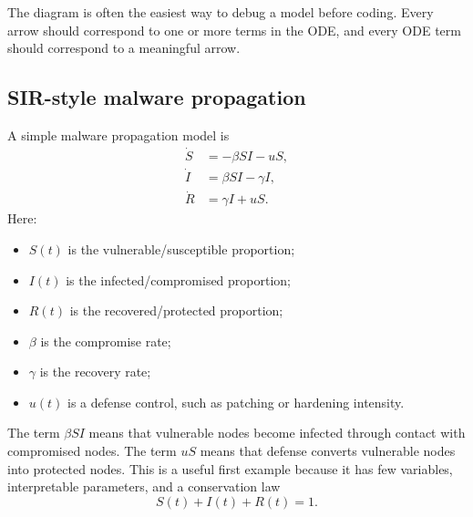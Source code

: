 \documentclass[11pt,a4paper]{article}
\begin{document}
\begin{center}
\end{center}

The diagram is often the easiest way to debug a model before coding. Every arrow should correspond to one or more terms in the ODE, and every ODE term should correspond to a meaningful arrow.

\subsection{SIR-style malware propagation}
A simple malware propagation model is
\begin{align}
    \dot{S} &= -\beta S I - u S,\label{eq:sir_s}\\
    \dot{I} &= \beta S I - \gamma I,\label{eq:sir_i}\\
    \dot{R} &= \gamma I + u S.\label{eq:sir_r}
\end{align}
Here:
\begin{itemize}[leftmargin=2em]
    \item $S(t)$ is the vulnerable/susceptible proportion;
    \item $I(t)$ is the infected/compromised proportion;
    \item $R(t)$ is the recovered/protected proportion;
    \item $\beta$ is the compromise rate;
    \item $\gamma$ is the recovery rate;
    \item $u(t)$ is a defense control, such as patching or hardening intensity.
\end{itemize}
The term $\beta S I$ means that vulnerable nodes become infected through contact with compromised nodes. The term $uS$ means that defense converts vulnerable nodes into protected nodes. This is a useful first example because it has few variables, interpretable parameters, and a conservation law
\begin{equation}
    S(t)+I(t)+R(t)=1.
\end{equation}
\end{document}
